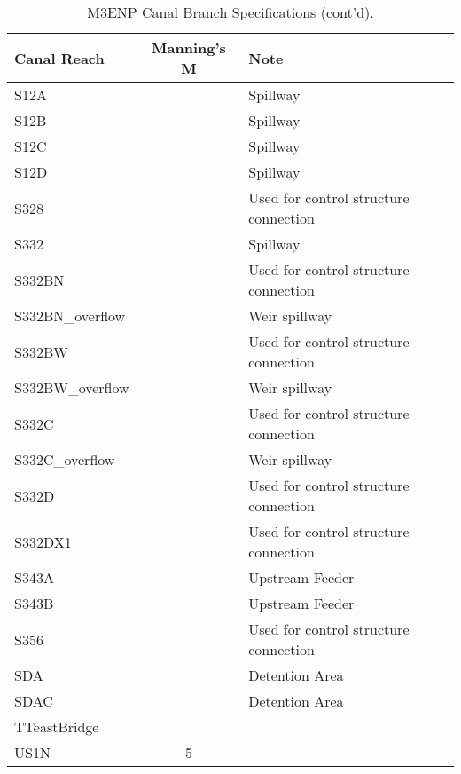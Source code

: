 \begin{table}[!h]
\caption{M3ENP Canal Branch Specifications (cont'd).}
\label{tab:canals2}
\begin{tabular}{lcl}
\hline
Canal Reach        & Manning's M  & Note                                        \\
\hline
S12A               &              & Spillway                                    \\
S12B               &              & Spillway                                    \\
S12C               &              & Spillway                                    \\
S12D               &              & Spillway                                    \\
S328               &              & Used for control structure connection       \\
S332               &              & Spillway                                    \\
S332BN             &              & Used for control structure connection       \\
S332BN\_overflow   &              & Weir spillway                               \\
S332BW             &              & Used for control structure connection       \\
S332BW\_overflow   &              & Weir spillway                               \\
S332C              &              & Used for control structure connection       \\
S332C\_overflow    &              & Weir spillway                               \\
S332D              &              & Used for control structure connection       \\
S332DX1            &              & Used for control structure connection       \\
S343A              &              & Upstream Feeder                             \\
S343B              &              & Upstream Feeder                             \\
S356               &              & Used for control structure connection       \\
SDA                &              & Detention Area                              \\
SDAC               &              & Detention Area                              \\
TTeastBridge       &              &                                             \\
US1N               & 5            &                                             \\
\hline
\end{tabular}
\end{table}


\cleardoublepage

